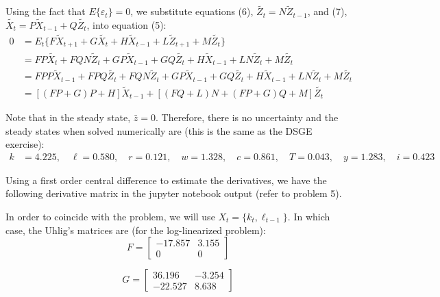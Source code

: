 \documentclass[letterpaper,11pt]{article}
\theoremstyle{definition}
\begin{document}
\begin{spacing}{1.5}
	\begin{Exercise} \label{Linear_HW_Algebra}
		Using the fact that $E\{\varepsilon_t\}=0$, we substitute equations (6), $\tilde{Z_t}=N\tilde{Z}_{t-1}$, and (7), $\tilde{X_t} = P\tilde{X}_{t-1}+Q\tilde{Z_t}$, into equation (5):
		\begin{align*}
			0 &= E_t\{F\tilde{X}_{t+1}+G\tilde{X_t}+H\tilde{X}_{t-1}+L\tilde{Z}_{t+1}+M\tilde{Z_t}\} \\
			&= FP\tilde{X_t}+FQN\tilde{Z}_{t}+GP\tilde{X}_{t-1}+GQ\tilde{Z_t}+H\tilde{X}_{t-1}+LN\tilde{Z}_{t}+M\tilde{Z_t} \\
			&= FPP\tilde{X}_{t-1}+FPQ\tilde{Z_t}+FQN\tilde{Z}_{t}+GP\tilde{X}_{t-1}+GQ\tilde{Z_t}+H\tilde{X}_{t-1}+LN\tilde{Z}_{t}+M\tilde{Z_t}\\
			&= [(FP+G)P+H]\tilde{X}_{t-1}+[(FQ+L)N+(FP+G)Q+M]\tilde{Z_t}
		\end{align*}
	\end{Exercise}

	\begin{Exercise} \label{Linear_HW_Base_Numer_SS}
		Note that in the steady state, $\bar{z} = 0$. Therefore, there is no uncertainty and the steady states when solved numerically are (this is the same as the DSGE exercise):
		\begin{align*}
			k&=4.225, \quad \ell= 0.580, \quad r= 0.121, \quad w=1.328, \quad c=0.861, \quad T=0.043, \quad y=1.283, \quad i=0.423
		\end{align*}
	\end{Exercise}

	\begin{Exercise} \label{Linear_HW_Base_Numer_Deriv}
			Using a first order central difference to estimate the derivatives, we have the following derivative matrix in the jupyter notebook output (refer to problem 5).
	\end{Exercise}

	\begin{Exercise} \label{Linear_HW_Base_Coeffs}

			In order to coincide with the problem, we will use  $X_t = \{k_t,\ell_{t-1}\}$. In which case, the Uhlig's matrices are (for the log-linearized problem):
			\[
				F =
				\begin{bmatrix}
					-17.857 & 3.155\\
					0 & 0
				\end{bmatrix}
			\]

			\[
				G =
				\begin{bmatrix}
					36.196 & -3.254\\
					-22.527 & 8.638
				\end{bmatrix}
			\]


\end{Exercise}
\end{spacing}
\end{document}
